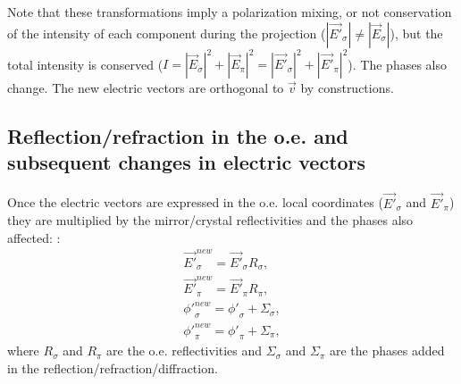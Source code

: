 \documentclass{iucr}
\begin{document}






Note that these transformations imply a polarization mixing, or not conservation of the intensity of each component during the projection ($|\vec{E'}_\sigma| \ne |\vec{E}_\sigma|$),
but the total intensity is conserved ($I=|\vec{E}_\sigma|^2+|\vec{E}_\pi|^2=
|\vec{E'}_\sigma|^2+|\vec{E'}_\pi|^2$). The phases also change.
The new electric vectors are orthogonal to $\vec{v}$ by constructions.

\subsection{Reflection/refraction in the o.e. and subsequent changes in electric vectors}
\label{sec:reflection}

Once the electric vectors are expressed in the o.e. local coordinates ($\vec{E'}_\sigma$ and 
$\vec{E'}_\pi$) they are multiplied by the mirror/crystal reflectivities and the phases also affected: : 
\begin{eqnarray}
 \label{reflectivities}
 \vec{E'}_\sigma^{new} = \vec{E'}_\sigma R_\sigma, \nonumber \\
 \vec{E'}_\pi^{new} = \vec{E'}_\pi R_\pi, \nonumber \\
 {\phi '}_\sigma^{new} = {\phi '}_\sigma + \Sigma_\sigma, \nonumber \\
 {\phi '}_\pi^{new} = {\phi '}_\pi + \Sigma_\pi,
\end{eqnarray}
where $R_\sigma$ and $R_\pi$ are the o.e. reflectivities and $\Sigma_\sigma$ and $\Sigma_\pi$ are the  phases added in the reflection/refraction/diffraction. 
\end{document}
